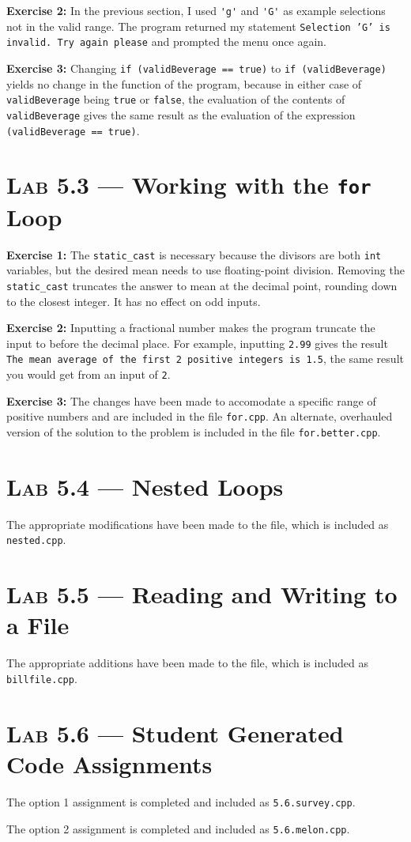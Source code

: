 \documentclass[11pt]{article}
\begin{document}
	\textbf{Exercise 2:} In the previous section, I used \lstinline{'g'} and \lstinline{'G'} as example selections not in the valid range. The program returned my statement \texttt{Selection 'G' is invalid. Try again please} and prompted the menu once again.
	
	\textbf{Exercise 3:} Changing \lstinline{if (validBeverage == true)} to \lstinline{if (validBeverage)} yields no change in the function of the program, because in either case of \lstinline{validBeverage} being \lstinline{true} or \lstinline{false}, the evaluation of the contents of \lstinline{validBeverage} gives the same result as the evaluation of the expression \lstinline{(validBeverage == true)}.
	

\section*{\textsc{Lab 5.3} --- Working with the \texttt{for} Loop}
	
	\textbf{Exercise 1:} The \lstinline{static_cast} is necessary because the divisors are both \lstinline{int} variables, but the desired mean needs to use floating-point division. Removing the \lstinline{static_cast} truncates the answer to mean at the decimal point, rounding down to the closest integer. It has no effect on odd inputs.
	
	\textbf{Exercise 2:} Inputting a fractional number makes the program truncate the input to before the decimal place. For example, inputting \texttt{2.99} gives the result \texttt{The mean average of the first 2 positive integers is 1.5}, the same result you would get from an input of \texttt{2}.
	
	\textbf{Exercise 3:} The changes have been made to accomodate a specific range of positive numbers and are included in the file \texttt{for.cpp}. An alternate, overhauled version of the solution to the problem is included in the file \texttt{for.better.cpp}.
	

\section*{\textsc{Lab 5.4} --- Nested Loops}
\noindent	The appropriate modifications have been made to the file, which is included as \texttt{nested.cpp}.
	

\section*{\textsc{Lab 5.5} --- Reading and Writing to a File}
\noindent	The appropriate additions have been made to the file, which is included as \texttt{billfile.cpp}.


\section*{\textsc{Lab 5.6} --- Student Generated Code Assignments}

	The option 1 assignment is completed and included as \texttt{5.6.survey.cpp}.
	
	The option 2 assignment is completed and included as \texttt{5.6.melon.cpp}.
\end{document}
